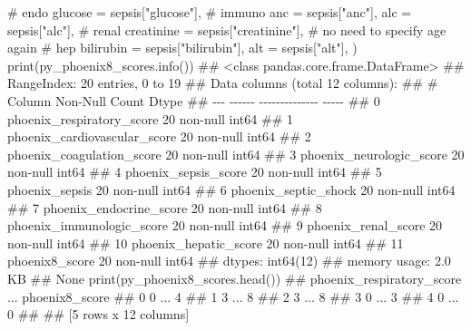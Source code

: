 \documentclass[
  letterpaper,
  DIV=11,
  numbers=noendperiod]{scrartcl}
\newenvironment{Shaded}{\begin{snugshade}}{\end{snugshade}}
\newcommand{\BuiltInTok}[1]{\textcolor[rgb]{0.00,0.23,0.31}{#1}}
\newcommand{\CommentTok}[1]{\textcolor[rgb]{0.37,0.37,0.37}{#1}}
\newcommand{\NormalTok}[1]{\textcolor[rgb]{0.00,0.23,0.31}{#1}}
\newcommand{\OperatorTok}[1]{\textcolor[rgb]{0.37,0.37,0.37}{#1}}
\newcommand{\StringTok}[1]{\textcolor[rgb]{0.13,0.47,0.30}{#1}}
\begin{document}
\begin{Shaded}
\begin{Highlighting}[]
  \CommentTok{\# endo}
\NormalTok{    glucose }\OperatorTok{=}\NormalTok{ sepsis[}\StringTok{"glucose"}\NormalTok{],}
  \CommentTok{\# immuno}
\NormalTok{    anc }\OperatorTok{=}\NormalTok{ sepsis[}\StringTok{"anc"}\NormalTok{],}
\NormalTok{    alc }\OperatorTok{=}\NormalTok{ sepsis[}\StringTok{"alc"}\NormalTok{],}
  \CommentTok{\# renal}
\NormalTok{    creatinine }\OperatorTok{=}\NormalTok{ sepsis[}\StringTok{"creatinine"}\NormalTok{],}
    \CommentTok{\# no need to specify age again}
  \CommentTok{\# hep}
\NormalTok{    bilirubin }\OperatorTok{=}\NormalTok{ sepsis[}\StringTok{"bilirubin"}\NormalTok{],}
\NormalTok{    alt }\OperatorTok{=}\NormalTok{ sepsis[}\StringTok{"alt"}\NormalTok{],}
\NormalTok{    )}
\BuiltInTok{print}\NormalTok{(py\_phoenix8\_scores.info())}
\CommentTok{\#\# \textless{}class \textquotesingle{}pandas.core.frame.DataFrame\textquotesingle{}\textgreater{}}
\CommentTok{\#\# RangeIndex: 20 entries, 0 to 19}
\CommentTok{\#\# Data columns (total 12 columns):}
\CommentTok{\#\#  \#   Column                        Non{-}Null Count  Dtype}
\CommentTok{\#\# {-}{-}{-}  {-}{-}{-}{-}{-}{-}                        {-}{-}{-}{-}{-}{-}{-}{-}{-}{-}{-}{-}{-}{-}  {-}{-}{-}{-}{-}}
\CommentTok{\#\#  0   phoenix\_respiratory\_score     20 non{-}null     int64}
\CommentTok{\#\#  1   phoenix\_cardiovascular\_score  20 non{-}null     int64}
\CommentTok{\#\#  2   phoenix\_coagulation\_score     20 non{-}null     int64}
\CommentTok{\#\#  3   phoenix\_neurologic\_score      20 non{-}null     int64}
\CommentTok{\#\#  4   phoenix\_sepsis\_score          20 non{-}null     int64}
\CommentTok{\#\#  5   phoenix\_sepsis                20 non{-}null     int64}
\CommentTok{\#\#  6   phoenix\_septic\_shock          20 non{-}null     int64}
\CommentTok{\#\#  7   phoenix\_endocrine\_score       20 non{-}null     int64}
\CommentTok{\#\#  8   phoenix\_immunologic\_score     20 non{-}null     int64}
\CommentTok{\#\#  9   phoenix\_renal\_score           20 non{-}null     int64}
\CommentTok{\#\#  10  phoenix\_hepatic\_score         20 non{-}null     int64}
\CommentTok{\#\#  11  phoenix8\_score                20 non{-}null     int64}
\CommentTok{\#\# dtypes: int64(12)}
\CommentTok{\#\# memory usage: 2.0 KB}
\CommentTok{\#\# None}
\BuiltInTok{print}\NormalTok{(py\_phoenix8\_scores.head())}
\CommentTok{\#\#    phoenix\_respiratory\_score  ...  phoenix8\_score}
\CommentTok{\#\# 0                          0  ...               4}
\CommentTok{\#\# 1                          3  ...               8}
\CommentTok{\#\# 2                          3  ...               8}
\CommentTok{\#\# 3                          0  ...               3}
\CommentTok{\#\# 4                          0  ...               0}
\CommentTok{\#\# }
\CommentTok{\#\# [5 rows x 12 columns]}
\end{Highlighting}
\end{Shaded}
\end{document}
